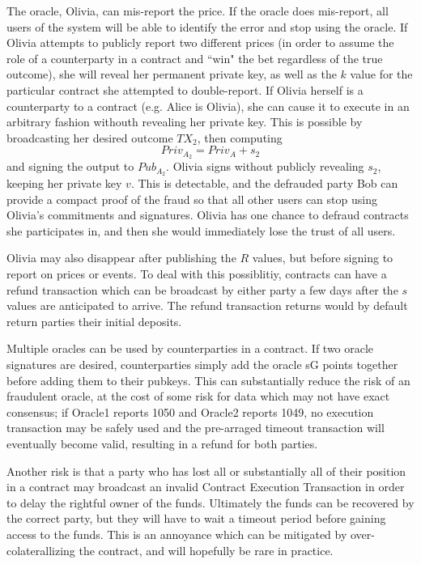 \documentclass[11pt]{article}
\begin{document}
The oracle, Olivia, can mis-report the price.  If the oracle does mis-report, all users of the system will be able to identify the error and stop using the oracle.  If Olivia attempts to publicly report two different prices (in order to assume the role of a counterparty in a contract and ``win" the bet regardless of the true outcome), she will reveal her permanent private key, as well as the \(k\) value for the particular contract she attempted to double-report.
If Olivia herself is a counterparty to a contract (e.g. Alice is Olivia), she can cause it to execute in an arbitrary fashion withouth revealing her private key.  This is possible by broadcasting her desired outcome \(TX_{2}\), then computing 
\[Priv_{A_2} =  Priv_{A} + s_{2}\]
and signing the output to \(Pub_{A_2}\).  Olivia signs without publicly revealing \(s_2\), keeping her private key \(v\).  This is detectable, and the defrauded party Bob can provide a compact proof of the fraud so that all other users can stop using Olivia's commitments and signatures.  Olivia has one chance to defraud contracts she participates in, and then she would immediately lose the trust of all users.

Olivia may also disappear after publishing the \(R\) values, but before signing to report on prices or events.  To deal with this possiblitiy, contracts can have a refund transaction which can be broadcast by either party a few days after the \(s\) values are anticipated to arrive.  The refund transaction returns would by default return parties their initial deposits.


Multiple oracles can be used by counterparties in a contract.  If two oracle signatures are desired, counterparties simply add the oracle sG points together before adding them to their pubkeys.  This can substantially reduce the risk of an fraudulent oracle, at the cost of some risk for data which may not have exact consensus; if Oracle1 reports 1050 and Oracle2 reports 1049, no execution transaction may be safely used and the pre-arraged timeout transaction will eventually become valid, resulting in a refund for both parties.

Another risk is that a party who has lost all or substantially all of their position in a contract may broadcast an invalid Contract Execution Transaction in order to delay the rightful owner of the funds.  Ultimately the funds can be recovered by the correct party, but they will have to wait a timeout period before gaining access to the funds.  This is an annoyance which can be mitigated by over-colaterallizing the contract, and will hopefully be rare in practice.
\end{document}

